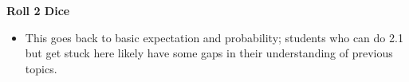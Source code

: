 \item \textbf{Roll 2 Dice}
\begin{itemize}
\item This goes back to basic expectation and probability; students who can do 2.1 but get stuck here likely have some gaps in their understanding of previous topics.
\end{itemize}